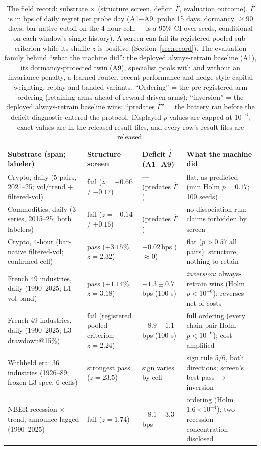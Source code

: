 \documentclass[sigconf,anonymous]{acmart}
\newcommand{\G}{\hat\Gamma}
\begin{document}
\begin{table}[t]
\centering
\caption{The field record: substrate $\times$ (structure screen, deficit
$\G$, evaluation outcome). $\G$ is in bps of daily regret per probe
day (A1$-$A9, probe 15 days, dormancy $\ge 90$ days, bar-native cutoff
on the 4-hour cell; $\pm$ is a 95\% CI
over seeds, conditional on each window's single history). A screen can
fail its registered pooled sub-criterion while its shuffle-$z$ is
positive (Section~\ref{sec:record}). The
evaluation family behind ``what the machine did'': the deployed
always-retrain baseline (A1), its dormancy-protected twin (A9),
specialist pools with and without an invariance penalty, a learned
router, recent-performance and hedge-style capital weighting, replay
and banded variants. ``Ordering''
= the pre-registered arm ordering (retaining arms ahead of reward-driven
arms); ``inversion'' = the deployed always-retrain baseline wins;
``predates $\G$'' = the battery ran before the deficit diagnostic
entered the protocol. Displayed $p$-values are capped at $10^{-6}$;
exact values are in the released result files, and every row's result
files are released.}
\label{tab:master}
\footnotesize
\begin{tabular}{@{}>{\raggedright\arraybackslash}p{148pt}>{\raggedright\arraybackslash}p{94pt}>{\raggedright\arraybackslash}p{96pt}>{\raggedright\arraybackslash}p{136pt}@{}}
\toprule
\textbf{Substrate (span; labeler)} & \textbf{Structure screen} &
\textbf{Deficit $\G$ (A1$-$A9)} & \textbf{What the machine did} \\
\midrule
Crypto, daily (5 pairs, 2021--25; vol/trend + filtered-vol) &
fail ($z=-0.66$ / $-0.17$) & --- (predates $\G$) &
flat, as predicted (min Holm $p=0.17$; 100 seeds) \\
Commodities, daily (3 series, 2015--25; both labelers) &
fail ($z=-0.14$ / $+0.16$) & --- (predates $\G$) &
no dissociation run; claims forbidden by screen \\
Crypto, 4-hour (bar-native filtered-vol; confirmed cell) &
pass ($+3.15\%$, $z=2.32$) & $+0.02$\,bps (${\approx}0$) &
flat ($p>0.57$ all pairs): structure, nothing to retain \\
\addlinespace
French 49 industries, daily (1990--2025; L1 vol-band) &
pass ($+1.14\%$, $z=3.18$) & $-1.3 \pm 0.7$\,bps (100 s) &
\emph{inversion}: always-retrain wins (Holm $p<10^{-6}$); reverses
net of costs \\
French 49 industries, daily (1990--2025; L3 drawdown@15\%) &
fail (registered pooled criterion; $z=2.24$) & $+8.9 \pm 1.1$\,bps
(100 s) &
full ordering (every chain pair Holm $p<10^{-6}$); cost-amplified \\
Withheld era: 36 industries (1926--89; frozen L3 spec, 6 cells) &
strongest pass ($z=23.5$) & sign varies by cell &
sign rule 5/6, both directions; screen's best pass $\to$ inversion \\
NBER recession $\times$ trend, announce-lagged (1990--2025) &
fail ($z=1.74$) & $+8.1 \pm 3.3$\,bps &
ordering (Holm $1.6{\times}10^{-4}$); two-recession concentration
disclosed \\
\bottomrule
\end{tabular}
\end{table}
\end{document}
